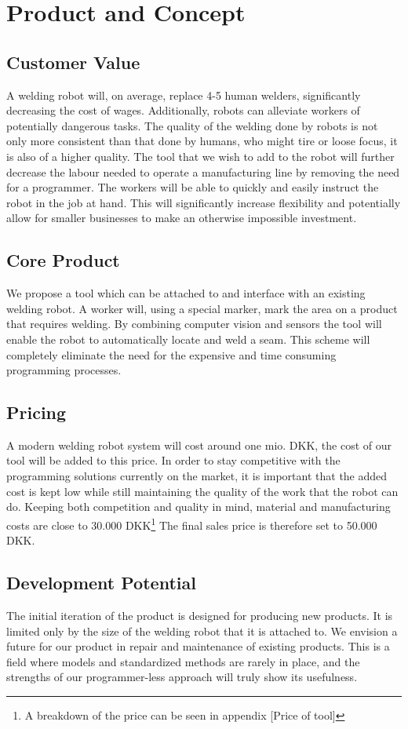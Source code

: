 
\section{Product and Concept}
\subsection{Customer Value}
A welding robot will, on average, replace 4-5 human welders, significantly decreasing the cost of wages. Additionally, robots can alleviate workers of potentially dangerous tasks. The quality of the welding done by robots is not only more consistent than that done by humans, who might tire or loose focus, it is also of a higher quality. The tool that we wish to add to the robot will further decrease the labour needed to operate a manufacturing line by removing the need for a programmer. The workers will be able to quickly and easily instruct the robot in the job at hand. This will significantly increase flexibility and potentially allow for smaller businesses to make an otherwise impossible investment.

\subsection{Core Product}
We propose a tool which can be attached to and interface with an existing welding robot. 
A worker will, using a special marker, mark the area on a product that requires welding. By combining computer vision and sensors the tool will enable the robot to automatically locate and weld a seam. This scheme will completely eliminate the need for the expensive and time consuming programming processes.

\subsection{Pricing}
A modern welding robot system will cost around one mio. DKK, the cost of our tool will be added to this price. In order to stay competitive with the programming solutions currently on the market, it is important that the added cost is kept low while still maintaining the quality of the work that the robot can do. Keeping both competition and quality in mind, material and manufacturing costs are close to 30.000 DKK\footnote{A breakdown of the price can be seen in appendix [Price of tool]} The final sales price is therefore set to 50.000 DKK.

\subsection{Development Potential}
The initial iteration of the product is designed for producing new products. It is limited only by the size of the welding robot that it is attached to. We envision a future for our product in repair and maintenance of existing products. This is a field where models and standardized methods are rarely in place, and the strengths of our programmer-less approach will truly show its usefulness.

